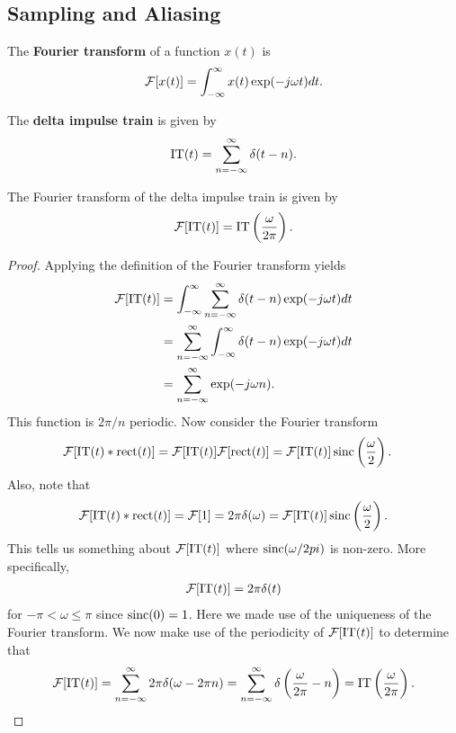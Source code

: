 \documentclass{memoir}
\begin{document}
\subsection{Sampling and Aliasing}
\begin{definition}
    The \textbf{Fourier transform} of a function $x(t)$ is
    \begin{align*}
        \mathcal{F}[x(t)] = \int_{-\infty}^{\infty} x(t) \exp(-j \omega t)dt.
    \end{align*}
\end{definition}
\begin{definition}
    The \textbf{delta impulse train} is given by
    \begin{align*}
        \operatorname{IT}(t)=\sum_{n=-\infty}^{\infty} \delta(t- n).
    \end{align*}
\end{definition}
\begin{theorem}
    The Fourier transform of the delta impulse train is given by
    \begin{align*}
        \mathcal{F}[\operatorname{IT}(t)]=\operatorname{IT}\left(\frac{\omega}{2 \pi}\right).
    \end{align*}
\end{theorem}
\begin{proof}
    Applying the definition of the Fourier transform yields
    \begin{align*}
        \mathcal{F}[\operatorname{IT}(t)] &= \int_{-\infty}^{\infty} \sum_{n=-\infty}^{\infty} \delta(t- n) \exp(-j \omega t)dt \\
        &= \sum_{n=-\infty}^{\infty}\int_{-\infty}^{\infty}\delta(t- n) \exp(-j \omega t)dt \\
        &= \sum_{n=-\infty}^{\infty} \exp(-j \omega n).
    \end{align*}
    This function is $2 \pi /n$ periodic. Now consider the Fourier transform
    \begin{align*}
        \mathcal{F}[\operatorname{IT}(t) \ast \operatorname{rect}(t)] &= \mathcal{F}[\operatorname{IT}(t)] \mathcal{F}[\operatorname{rect}(t)] = \mathcal{F}[\operatorname{IT}(t)] \operatorname{sinc}\left(\frac{\omega}{2}\right).
    \end{align*}
    Also, note that
    \begin{align*}
        \mathcal{F}[\operatorname{IT}(t) \ast \operatorname{rect}(t)] =\mathcal{F}[1] = 2 \pi \delta(\omega)= \mathcal{F}[\operatorname{IT}(t)] \operatorname{sinc}\left(\frac{\omega}{2}\right).
    \end{align*}
    This tells us something about $\mathcal{F}[\operatorname{IT}(t)]$ where $\operatorname{sinc}(\omega/2 pi)$ is non-zero. More specifically,
    \begin{align*}
        \mathcal{F}[\operatorname{IT}(t)] = 2 \pi \delta(t)
    \end{align*}
    for $-\pi < \omega \le \pi$ since $\operatorname{sinc}(0)=1$. Here we made use of the uniqueness of the Fourier transform. We now make use of the periodicity of $\mathcal{F}[\operatorname{IT}(t)]$ to determine that
    \begin{align*}
        \mathcal{F}[\operatorname{IT}(t)] = \sum_{n=-\infty}^{\infty} 2 \pi \delta(\omega - 2 \pi n)= \sum_{n=-\infty}^{\infty} \delta\left(\frac{\omega}{2\pi} - n\right) = \operatorname{IT}\left(\frac{\omega}{2\pi}\right).
    \end{align*}
\end{proof}
\end{document}
